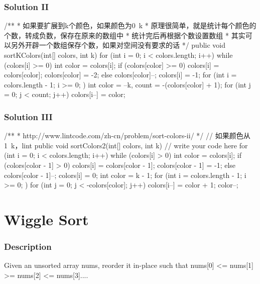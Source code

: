 \subsubsection{Solution II}
\begin{Code}
/**
 * 如果要扩展到k个颜色，如果颜色为0~k
 * 原理很简单，就是统计每个颜色的个数，转成负数，保存在原来的数组中
 * 统计完后再根据个数设置数组
 * 其实可以另外开辟一个数组保存个数，如果对空间没有要求的话
 */
public void sortKColors(int[] colors, int k) {
    for (int i = 0; i < colors.length; i++) {
        while (colors[i] >= 0) {
            int color = colors[i];
            if (colors[color] >= 0) {
                colors[i] = colors[color];
                colors[color] = -2;
            } else {
                colors[color]--;
                colors[i] = -1;
            }
        }
    }
    for (int i = colors.length - 1; i >= 0; ) {
        int color = --k, count = -(colors[color] + 1);
        for (int j = 0; j < count; j++) {
            colors[i--] = color;
        }
    }
}
\end{Code}

\subsubsection{Solution III}
\begin{Code}
/**
 * http://www.lintcode.com/zh-cn/problem/sort-colors-ii/
 */
// 如果颜色从1~k，lint
public void sortColors2(int[] colors, int k) {
    // write your code here
    for (int i = 0; i < colors.length; i++) {
        while (colors[i] > 0) {
            int color = colors[i];
            if (colors[color - 1] > 0) {
                colors[i] = colors[color - 1];
                colors[color - 1] = -1;
            } else {
                colors[color - 1]--;
                colors[i] = 0;
            }
        }
    }
    int color = k - 1;
    for (int i = colors.length - 1; i >= 0; ) {
        for (int j = 0; j < -colors[color]; j++) {
            colors[i--] = color + 1;
        }
        color--;
    }
}

\end{Code}

\newpage

\section{Wiggle Sort} %

\subsubsection{Description}
Given an unsorted array nums, reorder it in-place such that nums[0] <= nums[1] >= nums[2] <= nums[3]....

